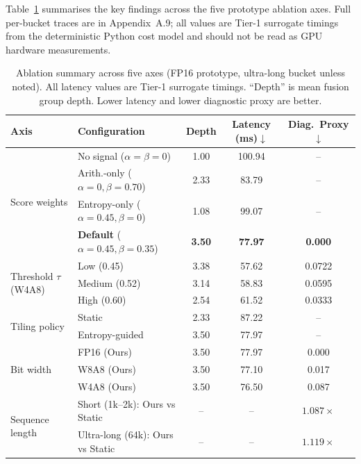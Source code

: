 

Table~\ref{tab:ablation_summary} summarises the key
findings across the five prototype ablation axes.
Full per-bucket traces are in Appendix~A.9; all values
are Tier-1 surrogate timings from the deterministic
Python cost model and should not be read as GPU hardware
measurements.

\begin{table}[t]
\centering
\caption{%
  Ablation summary across five axes (FP16 prototype,
  ultra-long bucket unless noted).
  All latency values are Tier-1 surrogate timings.
  ``Depth'' is mean fusion group depth.
  Lower latency and lower diagnostic proxy are better.}
\label{tab:ablation_summary}
\begin{tabular}{llccc}
\toprule
Axis & Configuration
  & Depth & Latency (ms)$\downarrow$
  & Diag.\ Proxy$\downarrow$ \\
\midrule
\multirow{4}{*}{Score weights}
  & No signal ($\alpha{=}\beta{=}0$)
    & 1.00 & 100.94 & -- \\
  & Arith.-only ($\alpha{=}0,\beta{=}0.70$)
    & 2.33 & 83.79  & -- \\
  & Entropy-only ($\alpha{=}0.45,\beta{=}0$)
    & 1.08 & 99.07  & -- \\
  & \textbf{Default} ($\alpha{=}0.45,\beta{=}0.35$)
    & \textbf{3.50} & \textbf{77.97} & \textbf{0.000} \\
\midrule
\multirow{3}{*}{Threshold $\tau$ (W4A8)}
  & Low (0.45)   & 3.38 & 57.62 & 0.0722 \\
  & Medium (0.52)& 3.14 & 58.83 & 0.0595 \\
  & High (0.60)  & 2.54 & 61.52 & 0.0333 \\
\midrule
\multirow{2}{*}{Tiling policy}
  & Static       & 2.33 & 87.22 & --     \\
  & Entropy-guided & 3.50 & 77.97 & --   \\
\midrule
\multirow{3}{*}{Bit width}
  & FP16 (Ours)  & 3.50 & 77.97  & 0.000 \\
  & W8A8 (Ours)  & 3.50 & 77.10  & 0.017 \\
  & W4A8 (Ours)  & 3.50 & 76.50  & 0.087 \\
\midrule
\multirow{2}{*}{Sequence length}
  & Short (1k--2k):  Ours vs Static & -- & -- & $1.087\times$ \\
  & Ultra-long (64k): Ours vs Static & -- & -- & $1.119\times$ \\
\bottomrule
\end{tabular}
\end{table}


